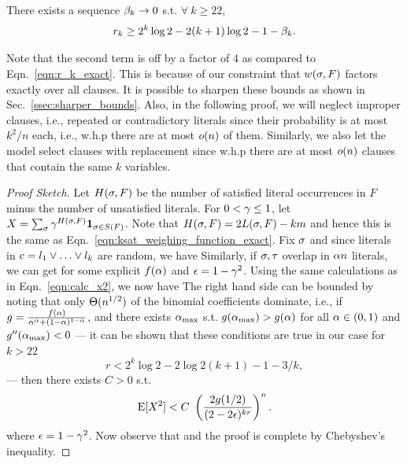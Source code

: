\documentclass[letterpaper, 10pt, twocolumn, reqno]{amsart}
\begin{document}
\begin{theorem}
There exists a sequence $\beta_k \to 0$ s.t. $\forall\ k \geq 22$,
$$
r_k \geq 2^k \log 2 - 2(k+1) \log 2 - 1 - \beta_k.
$$
\label{thm:bound_weighted}
\end{theorem}
\begin{remark}
Note that the second term is off by a factor of 4 as compared to Eqn.~\eqref{eqn:r_k_exact}. This is because of our constraint that $w(\sigma,F)$ factors exactly over all clauses. It is possible to sharpen these bounds as shown in Sec.~\ref{ssec:sharper_bounds}. Also, in the following proof, we will neglect improper clauses, i.e., repeated or contradictory literals since their probability is at most $k^2/n$ each, i.e., w.h.p there are at most $o(n)$ of them. Similarly, we also let the model select clauses with replacement since w.h.p there are at most $o(n)$ clauses that contain the same $k$ variables.
\end{remark}
%
\begin{proof}[Proof Sketch] Let ${H(\sigma,F)}$ be the number of satisfied literal occurrences in $F$ minus the number of unsatisfied literals. For $0 < \gamma \leq 1$, let $X = \sum_\sigma \gamma^{{H(\sigma,F)}} {\bf 1}_{\sigma \in S(F)}$.  Note that ${H(\sigma,F)} = 2L(\sigma,F) - k m$ and hence this is the same as Eqn.~\eqref{eqn:ksat_weighing_function_exact}. Fix $\sigma$ and since literals in $c = l_1 \vee \ldots \vee l_k$ are random, we have
Similarly, if $\sigma, \tau$ overlap in $\alpha n$ literals, we can get
for some explicit $f(\alpha)$ and $\epsilon = 1-\gamma^2$. Using the same calculations as in Eqn.~\eqref{eqn:calc_x2}, we now have
The right hand side can be bounded by noting that only $\Theta(n^{1/2})$ of the binomial coefficients dominate, i.e., if $g = \frac{f(\alpha)}{\alpha^\alpha + (1-\alpha)^{1-\alpha}}$,
and there exists $\alpha_{\max}$ s.t. $g(\alpha_{\max}) > g(\alpha)$ for all $\alpha \in (0,1)$ and $g''(\alpha_{\max}) < 0$ --- it can be shown that these conditions are true in our case for $k > 22$
$$
r < 2^k \log 2 -2 \log2(k+1) - 1 -3/k,
$$
--- then there exists $C > 0$ s.t.
$$
\textrm{E}[X^2] < C\ \left(\frac{2 g(1/2)}{(2-2\epsilon)^{kr}} \right)^n.
$$
where $\epsilon = 1-\gamma^2$. Now observe that
and the proof is complete by Chebyshev's inequality.
\end{proof}
\end{document}
